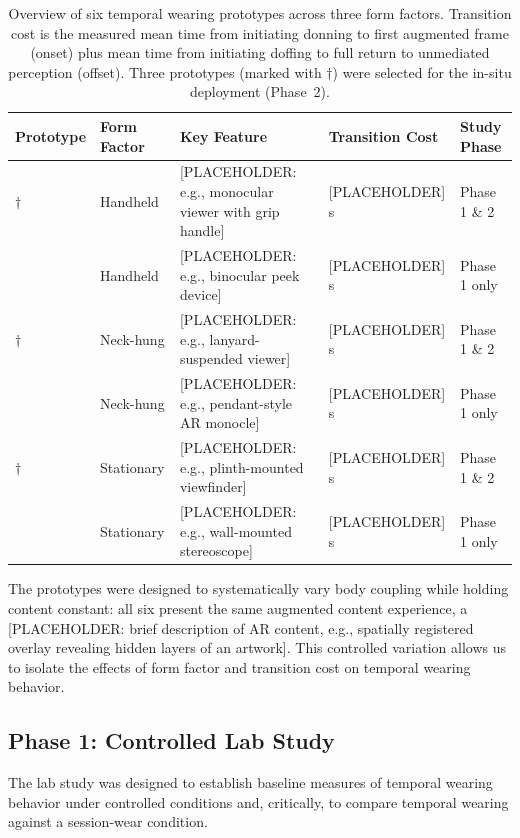 \begin{table}[t]
\centering
\caption{Overview of six temporal wearing prototypes across three form factors. Transition cost is the measured mean time from initiating donning to first augmented frame (onset) plus mean time from initiating doffing to full return to unmediated perception (offset). Three prototypes (marked with $\dagger$) were selected for the in-situ deployment (Phase~2).}
\label{tab:prototypes}
\begin{tabular}{p{2.8cm} p{1.8cm} p{4.5cm} p{2.2cm} p{2.5cm}}
\toprule
\textbf{Prototype} & \textbf{Form Factor} & \textbf{Key Feature} & \textbf{Transition Cost} & \textbf{Study Phase} \\
\midrule
[PROTOTYPE A]$\dagger$ & Handheld & [PLACEHOLDER: e.g., monocular viewer with grip handle] & [PLACEHOLDER] s & Phase 1 \& 2 \\
\addlinespace
[PROTOTYPE B] & Handheld & [PLACEHOLDER: e.g., binocular peek device] & [PLACEHOLDER] s & Phase 1 only \\
\addlinespace
[PROTOTYPE C]$\dagger$ & Neck-hung & [PLACEHOLDER: e.g., lanyard-suspended viewer] & [PLACEHOLDER] s & Phase 1 \& 2 \\
\addlinespace
[PROTOTYPE D] & Neck-hung & [PLACEHOLDER: e.g., pendant-style AR monocle] & [PLACEHOLDER] s & Phase 1 only \\
\addlinespace
[PROTOTYPE E]$\dagger$ & Stationary & [PLACEHOLDER: e.g., plinth-mounted viewfinder] & [PLACEHOLDER] s & Phase 1 \& 2 \\
\addlinespace
[PROTOTYPE F] & Stationary & [PLACEHOLDER: e.g., wall-mounted stereoscope] & [PLACEHOLDER] s & Phase 1 only \\
\bottomrule
\end{tabular}
\end{table}

The prototypes were designed to systematically vary body coupling while holding content constant: all six present the same augmented content experience, a [PLACEHOLDER: brief description of AR content, e.g., spatially registered overlay revealing hidden layers of an artwork]. This controlled variation allows us to isolate the effects of form factor and transition cost on temporal wearing behavior.

\subsection{Phase 1: Controlled Lab Study}

The lab study was designed to establish baseline measures of temporal wearing behavior under controlled conditions and, critically, to compare temporal wearing against a session-wear condition.

